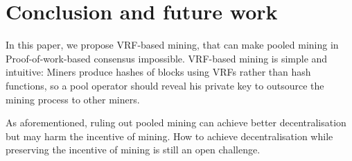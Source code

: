 \section{Conclusion and future work}
\label{sec:conclusion}

In this paper, we propose VRF-based mining, that can make pooled mining in Proof-of-work-based consensus impossible.
VRF-based mining is simple and intuitive: Miners produce hashes of blocks using VRFs rather than hash functions, so a pool operator should reveal his private key to outsource the mining process to other miners.

As aforementioned, ruling out pooled mining can achieve better decentralisation but may harm the incentive of mining.
How to achieve decentralisation while preserving the incentive of mining is still an open challenge.